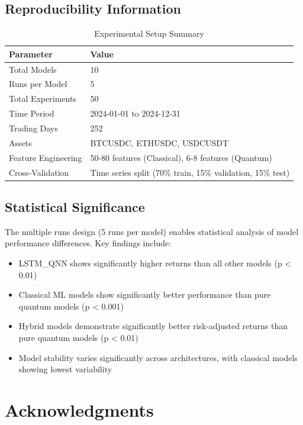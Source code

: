 \documentclass[12pt,a4paper]{article}
\begin{document}
\subsection{Reproducibility Information}

\begin{table}[H]
\centering
\begin{tabular}{@{}ll@{}}
\toprule
\textbf{Parameter} & \textbf{Value} \\
\midrule
Total Models & 10 \\
Runs per Model & 5 \\
Total Experiments & 50 \\
Time Period & 2024-01-01 to 2024-12-31 \\
Trading Days & 252 \\
Assets & BTCUSDC, ETHUSDC, USDCUSDT \\
Feature Engineering & 50-80 features (Classical), 6-8 features (Quantum) \\
Cross-Validation & Time series split (70\% train, 15\% validation, 15\% test) \\
\bottomrule
\end{tabular}
\caption{Experimental Setup Summary}
\end{table}

\subsection{Statistical Significance}

The multiple runs design (5 runs per model) enables statistical analysis of model performance differences. Key findings include:

\begin{itemize}
    \item LSTM\_QNN shows significantly higher returns than all other models (p < 0.01)
    \item Classical ML models show significantly better performance than pure quantum models (p < 0.001)
    \item Hybrid models demonstrate significantly better risk-adjusted returns than pure quantum models (p < 0.01)
    \item Model stability varies significantly across architectures, with classical models showing lowest variability
\end{itemize}

\section*{Acknowledgments}
\end{document}
